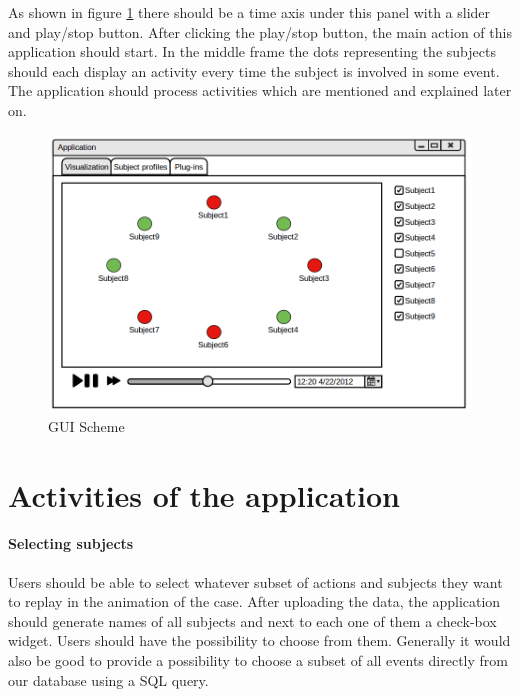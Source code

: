 As shown in figure \ref{predstava} there should be a time axis under this panel with a slider and play/stop button. After clicking the play/stop button, the main action of this application should start. In the middle frame the dots representing the subjects should each display an activity every time the subject is involved in some event. The application should process activities which are mentioned and explained later on.


\begin{figure}[h]
	\begin{center} 
	\includegraphics[width=1.0\textwidth]{./img/GUI/visualization.png}
	\end{center}
	\caption{GUI Scheme}\label{predstava}
\end{figure}

\section {Activities of the application} %
\paragraph{Selecting subjects}
Users should be able to select whatever subset of actions and subjects they want to replay in the animation of the case. After uploading the data, the application should generate names of all subjects and next to each one of them a check-box widget. Users should have the possibility to choose from them. Generally it would also be good to provide a possibility to choose a subset of all events directly from our database using a SQL query.

